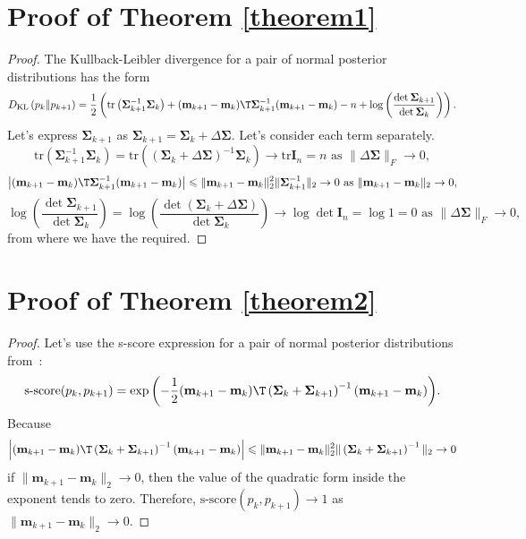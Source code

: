 \documentclass[sn-mathphys-num]{sn-jnl}%
\begin{document}
\newpage
\begin{appendices}

\section{Proof of Theorem \ref{theorem1}}
\begin{proof}
The Kullback-Leibler divergence for a pair of normal posterior distributions has the form
    \[ D_{\text{KL}}\left( p_k \| p_{k+1} \right) = \dfrac{1}{2} \left( \mathrm{tr}\left( \mathbf{\Sigma}_{k+1}^{-1} \mathbf{\Sigma}_k \right) + (\mathbf{m}_{k+1} - \mathbf{m}_k)\T \mathbf{\Sigma}_{k+1}^{-1} (\mathbf{m}_{k+1} - \mathbf{m}_k) - n + \log{\left( \dfrac{\det \mathbf{\Sigma}_{k+1}}{\det \mathbf{\Sigma}_{k}} \right)} \right). \]
    Let's express $\mathbf{\Sigma}_{k+1}$ as $\mathbf{\Sigma}_{k+1} = \mathbf{\Sigma}_k + \Delta\mathbf{\Sigma}$. Let's consider each term separately.
    \[ \mathrm{tr}\left( \mathbf{\Sigma}_{k+1}^{-1} \mathbf{\Sigma}_k \right) = \mathrm{tr}\left(\left(\mathbf{\Sigma}_k + \Delta \mathbf{\Sigma} \right)^{-1} \mathbf{\Sigma}_k \right) \to \mathrm{tr}\mathbf{I}_n=n\text{ as } \| \Delta \mathbf{\Sigma} \|_F \to 0, \]
    \[ \left| (\mathbf{m}_{k+1} - \mathbf{m}_k)\T\mathbf{\Sigma}_{k+1}^{-1} (\mathbf{m}_{k+1} - \mathbf{m}_k) \right| \leqslant\| \mathbf{m}_{k+1} -\mathbf{m}_k\|_2^2\|\mathbf{\Sigma}_{k+1}^{-1} \|_2 \to 0 \text{ as } \| \mathbf{m}_{k+1} - \mathbf{m}_k\|_2 \to 0, \]
    \[ \log{\left( \dfrac{\det \mathbf{\Sigma}_{k+1}}{\det \mathbf{\Sigma}_{k}} \right)} = \log{\left( \dfrac{\det \left( \mathbf{\Sigma}_k + \Delta \mathbf{\Sigma} \right)}{\det\mathbf{\Sigma}_{k}} \right)} \to \log \det\mathbf{I}_n = \log 1 = 0 \text{ as } \| \Delta \mathbf{\Sigma} \|_F\to 0, \]
    from where we have the required.
\end{proof}

\section{Proof of Theorem \ref{theorem2}}
\begin{proof}
Let's use the s-score expression for a pair of normal posterior distributions from~\cite{Aduenko2017}:
\[\text{s-score}(p_k, p_{k+1}) = \exp{\left( -\dfrac{1}{2} (\mathbf{m}_{k+1} - \mathbf{m}_k)\T \left( \mathbf{\Sigma}_k + \mathbf{\Sigma}_{k+1} \right)^{-1} (\mathbf{m}_{k+1} - \mathbf{m}_k) \right)}. \]
Because
    \[ \left| (\mathbf{m}_{k+1} - \mathbf{m}_k)\T \left( \mathbf{\Sigma}_k + \mathbf{\Sigma}_{k+1} \right)^{-1} (\mathbf{m}_{k+1} - \mathbf{m}_k) \right| \leqslant \| \mathbf{m}_{k+1} - \mathbf{m}_k \|_2^2 \| \left( \mathbf{\Sigma}_k + \mathbf{\Sigma}_{k+1} \right)^{-1} \|_2 \to 0 \]
    if $\|\mathbf{m}_{k+1} - \mathbf{m}_k\|_2\to 0$, then the value of the quadratic form inside the exponent tends to zero. Therefore, $\text{s-score}(p_k, p_{k+1}) \to 1$ as $\|\mathbf{m}_{k+1} - \mathbf{m}_k\|_2\to 0$.
\end{proof}


\end{appendices}
\end{document}
